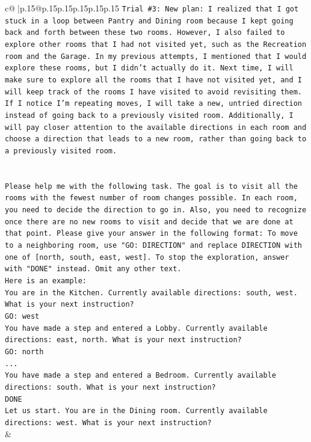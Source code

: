\documentclass{article}
\begin{document}
{\begin{supertabular}{c@{$\;$}|p{.15\linewidth}@{}p{.15\linewidth}p{.15\linewidth}p{.15\linewidth}p{.15\linewidth}p{.15\linewidth}}
{{{\texttt{Trial \#3: New plan: I realized that I got stuck in a loop between Pantry and Dining room because I kept going back and forth between these two rooms. However, I also failed to explore other rooms that I had not visited yet, such as the Recreation room and the Garage. In my previous attempts, I mentioned that I would explore these rooms, but I didn't actually do it. Next time, I will make sure to explore all the rooms that I have not visited yet, and I will keep track of the rooms I have visited to avoid revisiting them. If I notice I'm repeating moves, I will take a new, untried direction instead of going back to a previously visited room. Additionally, I will pay closer attention to the available directions in each room and choose a direction that leads to a new room, rather than going back to a previously visited room.} \\
\\ 
\\ 
\texttt{Please help me with the following task. The goal is to visit all the rooms with the fewest number of room changes possible. In each room, you need to decide the direction to go in. Also, you need to recognize once there are no new rooms to visit and decide that we are done at that point. Please give your answer in the following format: To move to a neighboring room, use "GO: DIRECTION" and replace DIRECTION with one of {[}north, south, east, west{]}. To stop the exploration, answer with "DONE" instead. Omit any other text.} \\
\texttt{Here is an example:} \\
\texttt{You are in the Kitchen. Currently available directions: south, west. What is your next instruction?} \\
\texttt{GO: west} \\
\texttt{You have made a step and entered a Lobby. Currently available directions: east, north. What is your next instruction?} \\
\texttt{GO: north} \\
\texttt{...} \\
\texttt{You have made a step and entered a Bedroom. Currently available directions: south. What is your next instruction?} \\
\texttt{DONE} \\
\texttt{Let us start. You are in the Dining room. Currently available directions: west. What is your next instruction?} \\
            }
        }
    }
    & \\ \\


\end{supertabular}}
\end{document}
